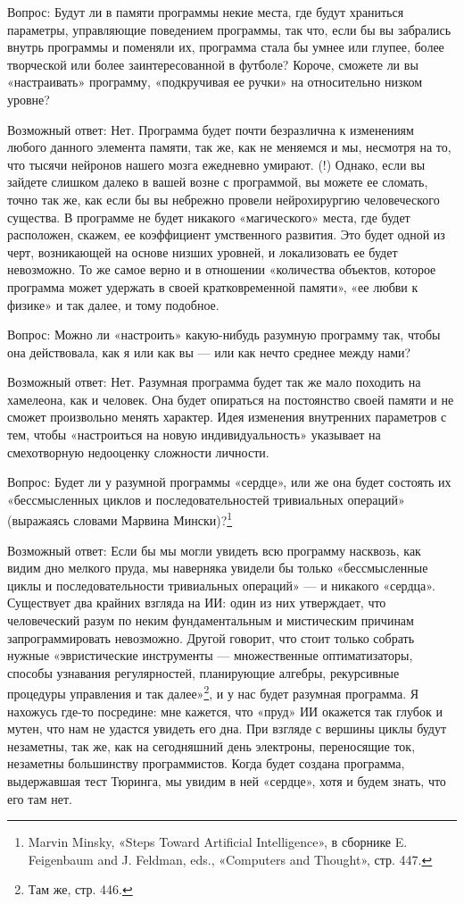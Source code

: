 \documentclass[../main.tex]{subfiles}
\begin{document}
Вопрос: Будут ли в памяти программы некие места, где будут храниться параметры, управляющие поведением программы, так что, если бы вы забрались внутрь программы и поменяли их, программа стала бы умнее или глупее, более творческой или более заинтересованной в футболе? Короче, сможете ли вы «настраивать» программу, «подкручивая ее ручки» на относительно низком уровне?

Возможный ответ: Нет. Программа будет почти безразлична к изменениям любого данного элемента памяти, так же, как не меняемся и мы, несмотря на то, что тысячи нейронов нашего мозга ежедневно умирают. (!) Однако, если вы зайдете слишком далеко в вашей возне с программой, вы можете ее сломать, точно так же, как если бы вы небрежно провели нейрохирургию человеческого существа. В программе не будет никакого «магического» места, где будет расположен, скажем, ее коэффициент умственного развития. Это будет одной из черт, возникающей на основе низших уровней, и локализовать ее будет невозможно. То же самое верно и в отношении «количества объектов, которое программа может удержать в своей кратковременной памяти», «ее любви к физике» и так далее, и тому подобное.

Вопрос: Можно ли «настроить» какую-нибудь разумную программу так, чтобы она действовала, как я или как вы --- или как нечто среднее между нами?

Возможный ответ: Нет. Разумная программа будет так же мало походить на хамелеона, как и человек. Она будет опираться на постоянство своей памяти и не сможет произвольно менять характер. Идея изменения внутренних параметров с тем, чтобы «настроиться на новую индивидуальность» указывает на смехотворную недооценку сложности личности.

Вопрос: Будет ли у разумной программы «сердце», или же она будет состоять их «бессмысленных циклов и последовательностей тривиальных операций» (выражаясь словами Марвина Мински)?\footnote{Marvin Minsky, «Steps Toward Artificial Intelligence», в сборнике E. Feigenbaum and J. Feldman, eds., «Computers and Thought», стр. 447.}

Возможный ответ: Если бы мы могли увидеть всю программу насквозь, как видим дно мелкого пруда, мы наверняка увидели бы только «бессмысленные циклы и последовательности тривиальных операций» --- и никакого «сердца». Существует два крайних взгляда на ИИ: один из них утверждает, что человеческий разум по неким фундаментальным и мистическим причинам запрограммировать невозможно. Другой говорит, что стоит только собрать нужные «эвристические инструменты --- множественные оптиматизаторы, способы узнавания регулярностей, планирующие алгебры, рекурсивные процедуры управления и так далее»\footnote{Там же, стр. 446.}, и у нас будет разумная программа. Я нахожусь где-то посредине: мне кажется, что «пруд» ИИ окажется так глубок и мутен, что нам не удастся увидеть его дна. При взгляде с вершины циклы будут незаметны, так же, как на сегодняшний день электроны, переносящие ток, незаметны большинству программистов. Когда будет создана программа, выдержавшая тест Тюринга, мы увидим в ней «сердце», хотя и будем знать, что его там нет.
\end{document}
